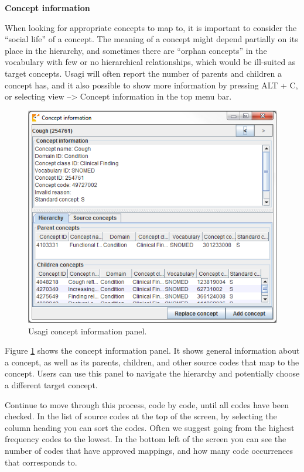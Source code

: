 \documentclass[11pt]{book}
\theoremstyle{definition}
\theoremstyle{definition}
\theoremstyle{definition}
\theoremstyle{remark}
\begin{document}
\textbf{Concept information}

When looking for appropriate concepts to map to, it is important to consider the ``social life'' of a concept. The meaning of a concept might depend partially on its place in the hierarchy, and sometimes there are ``orphan concepts'' in the vocabulary with few or no hierarchical relationships, which would be ill-suited as target concepts. Usagi will often report the number of parents and children a concept has, and it also possible to show more information by pressing ALT + C, or selecting view --\textgreater{} Concept information in the top menu bar.

\begin{figure}
\includegraphics[width=1\linewidth]{images/ExtractTransformLoad/usagiConceptInfo} \caption{Usagi concept information panel.}\label{fig:usagiConceptInfo}
\end{figure}

Figure \ref{fig:usagiConceptInfo} shows the concept information panel. It shows general information about a concept, as well as its parents, children, and other source codes that map to the concept. Users can use this panel to navigate the hierarchy and potentially choose a different target concept.

Continue to move through this process, code by code, until all codes have been checked. In the list of source codes at the top of the screen, by selecting the column heading you can sort the codes. Often we suggest going from the highest frequency codes to the lowest. In the bottom left of the screen you can see the number of codes that have approved mappings, and how many code occurrences that corresponds to.
\end{document}
